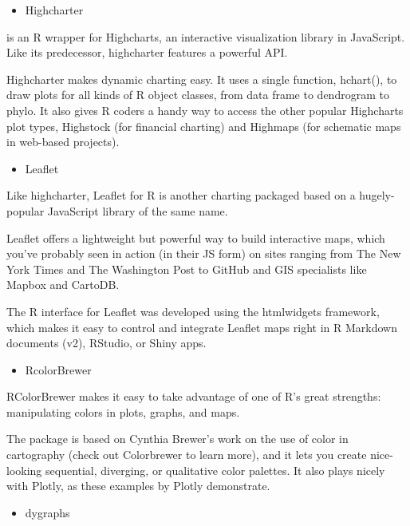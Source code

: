 \documentclass[
]{report}
\providecommand{\tightlist}{%
  \setlength{\itemsep}{0pt}\setlength{\parskip}{0pt}}
\begin{document}
\begin{itemize}
\tightlist
\item
  Highcharter
\end{itemize}

is an R wrapper for Highcharts, an interactive visualization library in JavaScript. Like its predecessor, highcharter features a powerful API.

Highcharter makes dynamic charting easy. It uses a single function, hchart(), to draw plots for all kinds of R object classes, from data frame to dendrogram to phylo. It also gives R coders a handy way to access the other popular Highcharts plot types, Highstock (for financial charting) and Highmaps (for schematic maps in web-based projects).

\begin{itemize}
\tightlist
\item
  Leaflet
\end{itemize}

Like highcharter, Leaflet for R is another charting packaged based on a hugely-popular JavaScript library of the same name.

Leaflet offers a lightweight but powerful way to build interactive maps, which you've probably seen in action (in their JS form) on sites ranging from The New York Times and The Washington Post to GitHub and GIS specialists like Mapbox and CartoDB.

The R interface for Leaflet was developed using the htmlwidgets framework, which makes it easy to control and integrate Leaflet maps right in R Markdown documents (v2), RStudio, or Shiny apps.

\begin{itemize}
\tightlist
\item
  RcolorBrewer
\end{itemize}

RColorBrewer makes it easy to take advantage of one of R's great strengths: manipulating colors in plots, graphs, and maps.

The package is based on Cynthia Brewer's work on the use of color in cartography (check out Colorbrewer to learn more), and it lets you create nice-looking sequential, diverging, or qualitative color palettes. It also plays nicely with Plotly, as these examples by Plotly demonstrate.

\begin{itemize}
\tightlist
\item
  dygraphs
\end{itemize}
\end{document}
